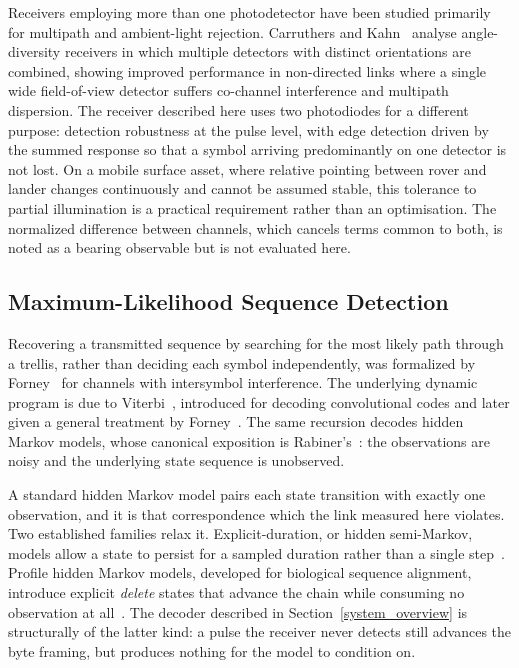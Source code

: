 Receivers employing more than one photodetector have been studied primarily for
multipath and ambient-light rejection. Carruthers and Kahn~\cite{Carruthers2000}
analyse angle-diversity receivers in which multiple detectors with distinct
orientations are combined, showing improved performance in non-directed links
where a single wide field-of-view detector suffers co-channel interference and
multipath dispersion. The receiver described here uses two photodiodes for a
different purpose: detection robustness at the pulse level, with edge detection
driven by the summed response so that a symbol arriving predominantly on one
detector is not lost. On a mobile surface asset, where relative pointing between
rover and lander changes continuously and cannot be assumed stable, this
tolerance to partial illumination is a practical requirement rather than an
optimisation. The normalized difference between channels, which cancels terms
common to both, is noted as a bearing observable but is not evaluated here.

\subsection{Maximum-Likelihood Sequence Detection}

Recovering a transmitted sequence by searching for the most likely path through
a trellis, rather than deciding each symbol independently, was formalized by
Forney~\cite{Forney1972} for channels with intersymbol interference. The
underlying dynamic program is due to Viterbi~\cite{Viterbi1967}, introduced for
decoding convolutional codes and later given a general treatment by
Forney~\cite{Forney1973}. The same recursion decodes hidden Markov models,
whose canonical exposition is Rabiner's~\cite{Rabiner1989}: the observations are
noisy and the underlying state sequence is unobserved.

A standard hidden Markov model pairs each state transition with exactly one
observation, and it is that correspondence which the link measured here
violates. Two established families relax it. Explicit-duration, or hidden
semi-Markov, models allow a state to persist for a sampled duration rather than
a single step~\cite{Rabiner1989}. Profile hidden Markov models, developed for
biological sequence alignment, introduce explicit \emph{delete} states that
advance the chain while consuming no observation at all~\cite{Krogh1994}. The
decoder described in Section~\ref{system_overview} is structurally of the
latter kind: a pulse the receiver never detects still advances the byte
framing, but produces nothing for the model to condition on.

